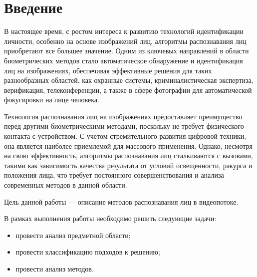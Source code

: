 \chapter*{Введение}

В настоящее время, с ростом интереса к развитию технологий идентификации 
личности, особенно на основе изображений лиц, алгоритмы распознавания лиц 
приобретают все большее значение. Одним из ключевых направлений в области 
биометрических методов стало автоматическое обнаружение и идентификация 
лиц на изображениях, обеспечивая эффективные решения для таких 
разнообразных областей, как охранные системы, криминалистическая 
экспертиза, верификация, телеконференции, а также в сфере фотографии для 
автоматической фокусировки на лице человека.

Технология распознавания лиц на изображениях предоставляет преимущество 
перед другими биометрическими методами, поскольку не требует физического 
контакта с устройством. С учетом стремительного развития цифровой техники, 
она является наиболее приемлемой для массового применения. Однако, 
несмотря на свою эффективность, алгоритмы распознавания лиц сталкиваются 
с вызовами, такими как зависимость качества результата от условий 
освещенности, ракурса и положения лица, что требует постоянного 
совершенствования и анализа современных методов в данной области.

Цель данной работы --- описание методов распознавания лиц в 
видеопотоке.

В рамках выполнения работы необходимо решить следующие задачи:

\begin{itemize}[label=---]
  \item провести анализ предметной области;
  \item провести классификацию подходов к решению;
  \item провести анализ методов.
\end{itemize}

